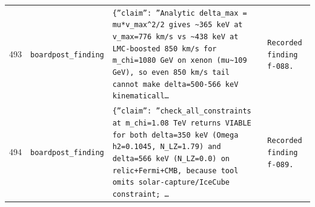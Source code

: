 \documentclass[11pt,a4paper]{article}
\begin{document}
\begin{longtable}{@{}p{}p{}p{}p{}@{}}
493 & \texttt{board}\newline\texttt{post\_\allowbreak{}finding} & \texttt{\{''claim'':\allowbreak{} ''Analytic delta\_\allowbreak{}max =\allowbreak{} mu*v\_\allowbreak{}max\textasciicircum{}\allowbreak{}2/\allowbreak{}2 gives \textasciitilde{}\allowbreak{}365 keV at v\_\allowbreak{}max=\allowbreak{}776 km/\allowbreak{}s vs \textasciitilde{}\allowbreak{}438 keV at LMC-boosted 850 km/\allowbreak{}s for m\_\allowbreak{}chi=\allowbreak{}1080 GeV on xenon (mu\textasciitilde{}\allowbreak{}109 GeV)\allowbreak{},\allowbreak{} so even 850 km/\allowbreak{}s tail cannot make delta=\allowbreak{}500-566 keV kinematicall\ldots{}\allowbreak{}} & \texttt{Recorded finding f-088.} \\
494 & \texttt{board}\newline\texttt{post\_\allowbreak{}finding} & \texttt{\{''claim'':\allowbreak{} ''check\_\allowbreak{}all\_\allowbreak{}constraints at m\_\allowbreak{}chi=\allowbreak{}1.08 TeV returns VIABLE for both delta=\allowbreak{}350 keV (Omega h2=\allowbreak{}0.1045,\allowbreak{} N\_\allowbreak{}LZ=\allowbreak{}1.79)\allowbreak{} and delta=\allowbreak{}566 keV (N\_\allowbreak{}LZ=\allowbreak{}0.0)\allowbreak{} on relic+Fermi+CMB,\allowbreak{} because tool omits solar-capture/\allowbreak{}IceCube constraint;\allowbreak{} \ldots{}\allowbreak{}} & \texttt{Recorded finding f-089.} \\
\bottomrule\end{longtable}
\end{document}
